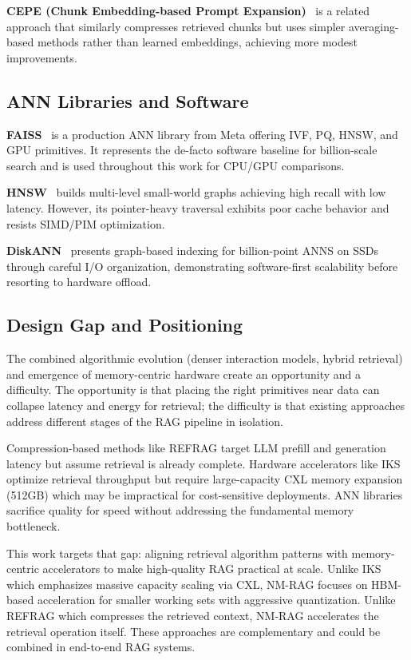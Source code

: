 \documentclass[conference]{IEEEtran}
\begin{document}
\textbf{CEPE (Chunk Embedding-based Prompt Expansion)}~\cite{cepe2024} is a related approach that similarly compresses retrieved chunks but uses simpler averaging-based methods rather than learned embeddings, achieving more modest improvements.

\subsection{ANN Libraries and Software}

\textbf{FAISS}~\cite{johnson2019faiss} is a production ANN library from Meta offering IVF, PQ, HNSW, and GPU primitives. It represents the de-facto software baseline for billion-scale search and is used throughout this work for CPU/GPU comparisons.

\textbf{HNSW}~\cite{malkov2018hnsw} builds multi-level small-world graphs achieving high recall with low latency. However, its pointer-heavy traversal exhibits poor cache behavior and resists SIMD/PIM optimization.

\textbf{DiskANN}~\cite{jayaram2019diskann} presents graph-based indexing for billion-point ANNS on SSDs through careful I/O organization, demonstrating software-first scalability before resorting to hardware offload.

\subsection{Design Gap and Positioning}

The combined algorithmic evolution (denser interaction models, hybrid retrieval) and emergence of memory-centric hardware create an opportunity and a difficulty. The opportunity is that placing the right primitives near data can collapse latency and energy for retrieval; the difficulty is that existing approaches address different stages of the RAG pipeline in isolation.

Compression-based methods like REFRAG target LLM prefill and generation latency but assume retrieval is already complete. Hardware accelerators like IKS optimize retrieval throughput but require large-capacity CXL memory expansion (512GB) which may be impractical for cost-sensitive deployments. ANN libraries sacrifice quality for speed without addressing the fundamental memory bottleneck.

This work targets that gap: aligning retrieval algorithm patterns with memory-centric accelerators to make high-quality RAG practical at scale. Unlike IKS which emphasizes massive capacity scaling via CXL, NM-RAG focuses on HBM-based acceleration for smaller working sets with aggressive quantization. Unlike REFRAG which compresses the retrieved context, NM-RAG accelerates the retrieval operation itself. These approaches are complementary and could be combined in end-to-end RAG systems.
\end{document}
